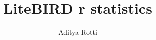 \documentclass[12pt]{article}
\begin{document}
\title{LiteBIRD r statistics}
\author{Aditya Rotti}
\date{}
\maketitle


\newpage

\end{document}
